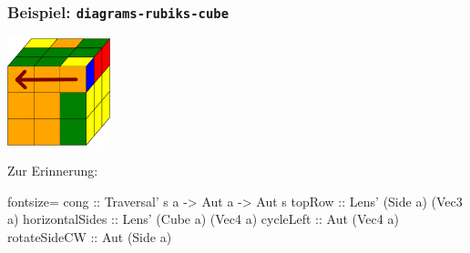 \documentclass{beamer}
\begin{document}
\begin{frame}[fragile]
  \frametitle{Beispiel: \texttt{diagrams-rubiks-cube}}
  \begin{minipage}{0.3 \linewidth}
    \includegraphics[width=3cm]{images/rubiks-cube.png}
  \end{minipage}
  \begin{minipage}{0.68 \linewidth}
  \end{minipage}

  \vspace{0.5cm}
  \begin{minipage}{0.7 \linewidth}
    \begin{mdframed}[backgroundcolor=yellow]
      Zur Erinnerung:
      \begin{haskellcode*}{fontsize=\footnotesize}
cong :: Traversal' s a -> Aut a -> Aut s
topRow :: Lens' (Side a) (Vec3 a)
horizontalSides :: Lens' (Cube a) (Vec4 a)
cycleLeft :: Aut (Vec4 a)
rotateSideCW :: Aut (Side a)
      \end{haskellcode*}
    \end{mdframed}
  \end{minipage}
\end{frame}
\fi
\end{document}
